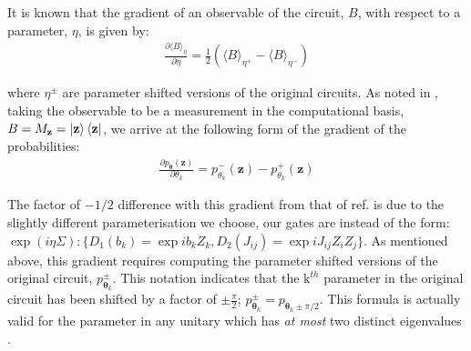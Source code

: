 It is known  that the gradient of an observable of the circuit, $B$, with respect to a parameter, $\eta$, is given by:
\begin{align}
\frac{\partial \langle B \rangle_\eta}{\partial \eta} = \frac{1}{2}\left(\langle B \rangle_{\eta^+} - \langle B \rangle_{\eta^-}\right) \label{liucircuitgradient}
\end{align} 


where $\eta^{\pm}$ are parameter shifted versions of the original circuits. As noted in , taking the observable to be a measurement in the computational basis, $B= M_{\mathbf{z}} =  \ket{\mathbf{z}}\bra{\mathbf{z}}$, we arrive at the following form of the gradient of the probabilities:
\begin{align}
\frac{\partial p_{\boldsymbol\theta}(\mathbf{z})}{\partial \theta_k} = p_{\theta_k}^{-}(\mathbf{z}) - p_{\theta_k}^{+}(\mathbf{z}) \label{mmdprobabilitygradient}
\end{align}

The factor of $-1/2$ difference with this gradient from that of ref.  is due to the slightly different parameterisation we choose, our gates are instead of the form: $\exp(i\eta\Sigma): \{D_1(b_k) =  \exp{ib_k Z_k}, D_2(J_{ij}) = \exp{iJ_{ij}Z_iZ_j}\}$.
As mentioned above, this gradient requires computing the parameter shifted versions of the original circuit, $p_{\boldsymbol\theta_k}^{\pm}$. This notation indicates that the $\text{k}^{th}$ parameter in the original circuit has been shifted by a factor of $\pm \frac{\pi}{2}$; $p_{{\boldsymbol\theta}_k}^{\pm} = p_{{\boldsymbol\theta}_k \pm \pi/2}$. This formula is actually valid for the parameter in any unitary which has \textit{at most} two distinct eigenvalues .


